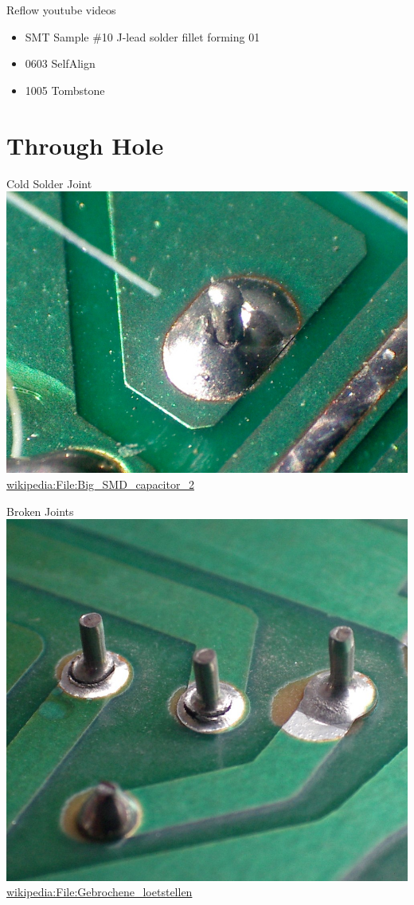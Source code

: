 \documentclass{presentation}
\begin{document}
\begin{frame}{Reflow}
  youtube videos
  \begin{itemize}
    \item SMT \: Sample \#10 J-lead solder fillet forming 01
    \item 0603 SelfAlign
    \item 1005 Tombstone
  \end{itemize}
\end{frame}

\section{Through Hole}

\begin{frame}{Cold Solder Joint}
  \centering
  \includegraphics[width=\textwidth*3/4]{./Cold_solder_joint2.jpg} \\
  \url{wikipedia:File:Big_SMD_capacitor_2}
\end{frame}

\begin{frame}{Broken Joints}
  \centering
  \includegraphics[width=\textwidth*3/4]{./Gebrochene_loetstellen.jpg} \\
  \url{wikipedia:File:Gebrochene_loetstellen}
\end{frame}
\end{document}
